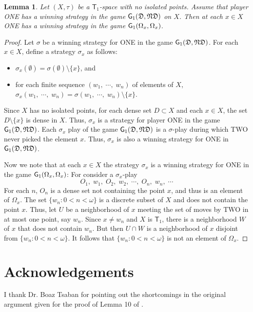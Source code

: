 \documentclass{amsart}
\newtheorem{lemma}[theorem]{{\bf Lemma}}
\newcommand{\gone}{{\sf G}_1}
\begin{document}
\begin{lemma}\label{modestlemma}
Let $(X,\tau)$ be a $\textsf{T}_1$-space with no isolated points. Assume that player ONE has a winning strategy in the game $\gone(\mathfrak{D},\mathfrak{ND})$ on $X$. Then at each $x\in X$ ONE has a winning strategy in the game $\gone(\Omega_x,\Omega_x)$.
\end{lemma}
\begin{proof} 
Let $\sigma$ be a winning strategy for ONE in the game $\gone(\mathfrak{D},\mathfrak{ND})$. For each $x\in X$, define a strategy $\sigma_x$ as follows:
\begin{itemize}
\item{$\sigma_x(\emptyset) = \sigma(\emptyset)\setminus\{x\}$, and }
\item{for each finite sequence $(w_1,\;\cdots,\; w_n)$ of elements of $X$, $\sigma_x(w_1,\;\cdots,\; w_n) = \sigma(w_1,\;\cdots,\; w_n)\setminus\{x\}$.}
\end{itemize}
Since $X$ has no isolated points, for each dense set $D\subset X$ and each $x\in X$, the set $D\setminus\{x\}$ is dense in $X$. Thus, $\sigma_x$ is a strategy for player ONE in the game $\gone(\mathfrak{D},\mathfrak{ND})$. 
Each $\sigma_x$ play of the game $\gone(\mathfrak{D},\mathfrak{ND})$ is a $\sigma$-play during which TWO never picked the element $x$. Thus, $\sigma_x$ is also a winning strategy for ONE in $\gone(\mathfrak{D},\mathfrak{ND})$.

Now we note that at each $x\in X$ the strategy $\sigma_x$ is a winning strategy for ONE in the game $\gone(\Omega_x,\Omega_x)$: For consider a $\sigma_x$-play
\[
   O_1,\; w_1,\; O_2,\; w_2,\; \cdots,\; O_n,\; w_n,\; \cdots
\]
For each $n$, $O_n$ is a dense set not containing the point $x$, and thus is an element of $\Omega_x$. The set $\{w_n:0<n<\omega\}$ is a discrete subset of $X$ and does not contain the point $x$. Thus, let $U$ be a neighborhood of $x$ meeting the set of moves by TWO in at most one point, say $w_n$. Since $x\neq w_n$ and $X$ is $\textsf{T}_1$, there is a neighborhood $W$ of $x$ that does not contain $w_n$. But then $U\cap W$ is a neighborhood of $x$ disjoint from $\{w_n:0<n<\omega\}$. It follows that $\{w_n:0<n<\omega\}$ is not an element of $\Omega_x$.
\end{proof}


\section*{Acknowledgements}
I thank Dr. Boaz Tsaban for pointing out the shortcomings in the original argument given for the proof of Lemma 10 of \cite{RCT}.
\end{document}
